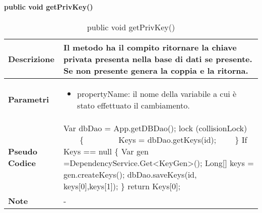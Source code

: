 \paragraph{public void getPrivKey()}
\begin{center}
    \begin{longtable}{|p{3cm}|p{9cm}|}%
    \caption{public void getPrivKey()}
    \endfirsthead
    \endhead
    \hline
    \textbf{Descrizione} & Il metodo ha il compito ritornare la chiave privata presenta nella base di dati se presente. Se non presente genera la coppia e la ritorna.\\
    \hline
    \textbf{Parametri} &      
    \begin{itemize}
        \item propertyName: il nome della variabile a cui è stato effettuato il cambiamento.
    \end{itemize}
    \\
    \hline
    \textbf{Pseudo Codice} & 
    Var dbDao = App.getDBDao();\newline
    lock (collisionLock)\newline
        \{\newline
            Keys = dbDao.getKeys(id);\newline
        \}\newline
    If Keys == null \{\newline
        Var gen =DependencyService.Get<KeyGen>();\newline
        Long[] keys =  gen.createKeys();\newline
    dbDao.saveKeys(id, keys[0],keys[1]);\newline
    \} \newline
    return Keys[0];\newline
    \\
    \hline
    \textbf{Note} & 
    -
    \\
    \hline
    \end{longtable}
\end{center}



